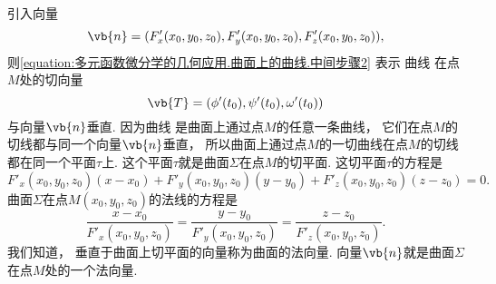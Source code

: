 引入向量\begin{equation}
	\vb{n}=(F'_x(x_0,y_0,z_0),F'_y(x_0,y_0,z_0),F'_z(x_0,y_0,z_0)),
\end{equation}
则\cref{equation:多元函数微分学的几何应用.曲面上的曲线.中间步骤2} 表示
曲线 
在点\(M\)处的切向量\begin{equation*}
	\vb{T} = (\phi'(t_0),\psi'(t_0),\omega'(t_0))
\end{equation*}与向量\(\vb{n}\)垂直.
因为曲线 
是曲面上通过点\(M\)的任意一条曲线，
它们在点\(M\)的切线都与同一个向量\(\vb{n}\)垂直，
所以曲面上通过点\(M\)的一切曲线在点\(M\)的切线都在同一个平面\(\tau\)上.
这个平面\(\tau\)就是曲面\(\Sigma\)在点\(M\)的切平面.
这切平面\(\tau\)的方程是
\begin{equation}\label{equation:多元函数微分学的几何应用.曲面的切平面方程}
	F'_x(x_0,y_0,z_0) (x-x_0)
	+ F'_y(x_0,y_0,z_0) (y-y_0)
	+ F'_z(x_0,y_0,z_0) (z-z_0)
	= 0.
\end{equation}
曲面\(\Sigma\)在点\(M(x_0,y_0,z_0)\)的法线的方程是
\begin{equation}\label{equation:多元函数微分学的几何应用.曲面的法线方程}
	\frac{x-x_0}{F'_x(x_0,y_0,z_0)}
	=\frac{y-y_0}{F'_y(x_0,y_0,z_0)}
	=\frac{z-z_0}{F'_z(x_0,y_0,z_0)}.
\end{equation}
我们知道，
垂直于曲面上切平面的向量称为曲面的法向量.
向量\(\vb{n}\)就是曲面\(\Sigma\)在点\(M\)处的一个法向量.

